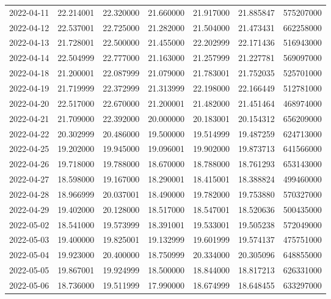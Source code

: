 \begin{tabular}{lrrrrrr}
2022-04-11 &   22.214001 &   22.320000 &   21.660000 &   21.917000 &   21.885847 &   575207000 \\
2022-04-12 &   22.537001 &   22.725000 &   21.282000 &   21.504000 &   21.473431 &   662258000 \\
2022-04-13 &   21.728001 &   22.500000 &   21.455000 &   22.202999 &   22.171436 &   516943000 \\
2022-04-14 &   22.504999 &   22.777000 &   21.163000 &   21.257999 &   21.227781 &   569097000 \\
2022-04-18 &   21.200001 &   22.087999 &   21.079000 &   21.783001 &   21.752035 &   525701000 \\
2022-04-19 &   21.719999 &   22.372999 &   21.313999 &   22.198000 &   22.166449 &   512781000 \\
2022-04-20 &   22.517000 &   22.670000 &   21.200001 &   21.482000 &   21.451464 &   468974000 \\
2022-04-21 &   21.709000 &   22.392000 &   20.000000 &   20.183001 &   20.154312 &   656209000 \\
2022-04-22 &   20.302999 &   20.486000 &   19.500000 &   19.514999 &   19.487259 &   624713000 \\
2022-04-25 &   19.202000 &   19.945000 &   19.096001 &   19.902000 &   19.873713 &   641566000 \\
2022-04-26 &   19.718000 &   19.788000 &   18.670000 &   18.788000 &   18.761293 &   653143000 \\
2022-04-27 &   18.598000 &   19.167000 &   18.290001 &   18.415001 &   18.388824 &   499460000 \\
2022-04-28 &   18.966999 &   20.037001 &   18.490000 &   19.782000 &   19.753880 &   570327000 \\
2022-04-29 &   19.402000 &   20.128000 &   18.517000 &   18.547001 &   18.520636 &   500435000 \\
2022-05-02 &   18.541000 &   19.573999 &   18.391001 &   19.533001 &   19.505238 &   572049000 \\
2022-05-03 &   19.400000 &   19.825001 &   19.132999 &   19.601999 &   19.574137 &   475751000 \\
2022-05-04 &   19.923000 &   20.400000 &   18.750999 &   20.334000 &   20.305096 &   648855000 \\
2022-05-05 &   19.867001 &   19.924999 &   18.500000 &   18.844000 &   18.817213 &   626331000 \\
2022-05-06 &   18.736000 &   19.511999 &   17.990000 &   18.674999 &   18.648455 &   633297000 \\

\end{tabular}
